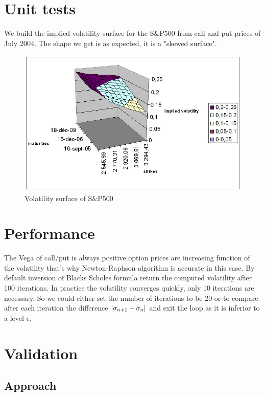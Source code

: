 \section{Unit tests}
We build the implied volatility surface for the S$\&$P500 from call and put prices of July 2004. The shape we get is as expected, it is a "skewed surface".
\begin{figure}
\begin{center}
        \includegraphics[width=12cm]{volsurfjoseph.jpg}
        \caption{Volatility surface of S$\&$P500}
\end{center}
\end{figure}

\section{Performance}

The Vega of call/put is always positive option prices are increasing function of the volatility that's why Newton-Raphson algorithm is accurate in this case. By default inversion of Blacks Scholes formula return the computed volatility after 100 iterations. In practice the volatility converges quickly, only 10 iterations are necessary. So we could either set the number of iterations to be 20 or to compare after each iteration the difference $|\sigma_{n+1}-\sigma_n|$ and exit the loop as it is inferior to a level $\epsilon$.


\section{Validation}


\subsection{Approach}

